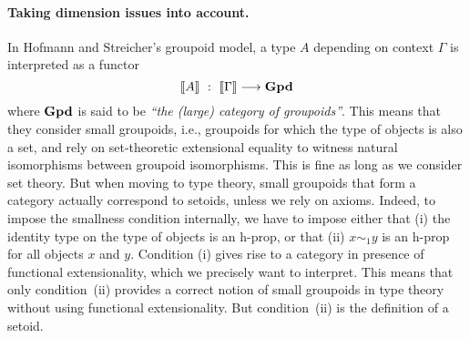 \paragraph{\bf Taking dimension issues into account.}
%

In Hofmann and Streicher's groupoid model, a type $A$ depending on
context $\Gamma$ is interpreted as a functor 
$$
\sem{A} \ : \ \sem{\Gamma} \longrightarrow \GPD
$$
%
where $\mathbf{Gpd}$ is said to be \emph{``the (large) category of groupoids''}. 
%
This means that they consider small groupoids, 
i.e., groupoids for which the type of objects is also a set, and
rely on set-theoretic extensional equality to witness natural
isomorphisms between groupoid isomorphisms. This is fine as long as we
consider set theory.
%
%
%
But when moving to type theory, small groupoids that form a category
actually correspond to setoids, unless we rely on axioms. Indeed, to
impose the smallness condition internally, we have to impose either that
(i) the identity type on the type of objects is an h-prop, or that (ii)
$x \sim_1 y$ is an h-prop for all objects $x$ and $y$. Condition (i)
gives rise to a category in presence of functional extensionality,
which we precisely want to interpret.
%
This means that only condition~(ii) provides a correct notion
of small groupoids in type theory without using functional
extensionality. But condition~(ii) is the definition of a setoid.
%
%

